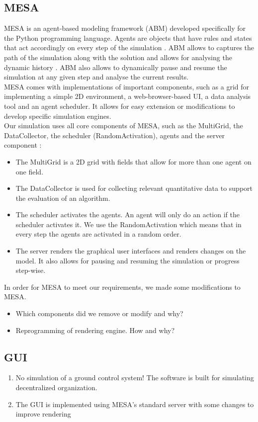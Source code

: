 \subsection{MESA}
MESA \cite{masad.2015} is an agent-based modeling framework (ABM) developed specifically for the Python programming language.  Agents are objects that have rules and states that act accordingly on every step of the simulation \cite{axtell.2000}. ABM allows to captures the path of the simulation along with the solution and allows for analysing the dynamic history \cite{axtell.2000}. ABM also allows to dynamically pause and resume the simulation at any given step and analyse the current results.\\
MESA comes with implementations of important components, such as a grid for implementing a simple 2D environment, a web-browser-based UI, a data analysis tool and an agent scheduler. It allows for easy extension or modifications to develop specific simulation engines. \\
Our simulation uses all core components of MESA, such as the MultiGrid, the DataCollector, the scheduler (RandomActivation), agents and the server component \cite{masad.2015}:
\begin{itemize}
	\item The MultiGrid is a 2D grid with fields that allow for more than one agent on one field.
	\item The DataCollector is used for collecting relevant quantitative data  to support the evaluation of an algorithm.
	\item The scheduler activates the agents. An agent will only do an action if the scheduler activates it. We use the RandomActivation which means that in every step the agents are activated in a random order.
	\item The server renders the graphical user interfaces and renders changes on the model. It also allows for pausing and resuming the simulation or progress step-wise.
\end{itemize} 
In order for MESA to meet our requirements, we made some modifications to MESA.


\begin{itemize}
	\item Which components did we remove or modify and why?
	\item Reprogramming of rendering engine. How and why?
\end{itemize}


\subsection{GUI}
\begin{enumerate}

	\item No simulation of a ground control system! The software is built for simulating decentralized organization.
	\item The GUI is implemented using MESA's standard server with some changes to improve rendering
\end{enumerate}


